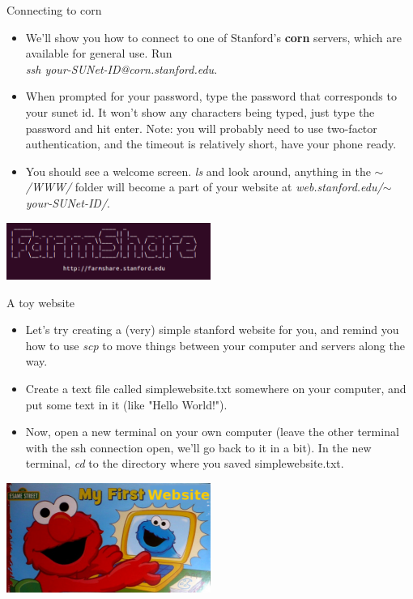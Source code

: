 \documentclass{beamer}
\begin{document}
\begin{frame}{Connecting to corn}
\begin{itemize}
    \item<1-> We'll show you how to connect to one of Stanford's \textbf{corn} servers, which are available for general use. Run \\ \emph{ssh your-SUNet-ID@corn.stanford.edu}.
    \item<1-> When prompted for your password, type the password that corresponds to your sunet id. It won't show any characters being typed, just type the password and hit enter. Note: you will probably need to use two-factor authentication, and the timeout is relatively short, have your phone ready.
    \item<2-> You should see a welcome screen. \emph{ls} and look around, anything in the \emph{$\sim$/WWW/} folder will become a part of your website at \emph{web.stanford.edu/$\sim$your-SUNet-ID/}.
\end{itemize}
\begin{center}\vspace{0em}\includegraphics[width = 0.5\textwidth]{images/farmshare.png}\end{center}
\end{frame}

\begin{frame}{A toy website}
\begin{itemize}
    \item<1-> Let's try creating a (very) simple stanford website for you, and remind you how to use \emph{scp} to move things between your computer and servers along the way.
    \item<2-> Create a text file called simplewebsite.txt somewhere on your computer, and put some text in it (like "Hello World!").  
    \item<3-> Now, open a new terminal on your own computer (leave the other terminal with the ssh connection open, we'll go back to it in a bit). In the new terminal, \emph{cd} to the directory where you saved simplewebsite.txt.  
\end{itemize}
\begin{center}
\includegraphics[width = 0.5\textwidth]{images/firstwebsite.jpg}
\end{center}
\end{frame}
\end{document}

